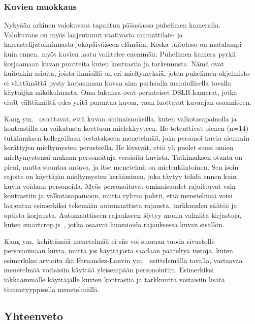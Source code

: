 \documentclass[finnish, 12pt, a4paper, elec, utf8, a-1b]{aaltothesis}
\begin{document}
\subsubsection{Kuvien muokkaus}\label{images-personalization}

Nykyään arkinen valokuvaus tapahtuu pääasiassa puhelimen kameralla. Valokuvaus
on myös laajentunut vaativasta ammattilais- ja harrastelijatoiminnasta
jokapäiväiseen elämään. Koska taitotaso on matalampi kuin ennen, myös kuvien
laatu vaihtelee enemmän. Puhelimen kamera pyrkii korjaamaan kuvan puutteita
kuten kontrastia ja tarkennusta. Nämä ovat kuitenkin asioita, joista ihmisillä
on eri mieltymyksiä, joten puhelimen ohjelmisto ei välttämättä pysty korjaamaan
kuvaa aina parhaalla mahdollisella tavalla käyttäjän näkökulmasta. Oma lukunsa
ovat perinteiset DSLR-kamerat, jotka eivät välttämättä edes yritä parantaa
kuvaa, vaan luottavat kuvaajan osaamiseen.

Kang ym.~\cite{5539850} osoittavat, että kuvan ominaisuuksilla, kuten
valkotasapainolla ja kontrastilla on vaikutusta koettuun mielekkyyteen. He
toteuttivat pienen (n=14) tutkimuksen kollegoillaan testatakseen menetelmää,
joka personoi kuvia aiemmin kerättyjen mieltymysten perusteella. He löysivät,
että yli puolet suosi omien mieltymystensä mukaan personoituja versioita
kuvista. Tutkimuksen otanta on pieni, mutta suuntaa antava, ja itse menetelmä on
mielenkiintoinen. Sen isoin rajoite on käyttäjän mieltymysten kerääminen, joka
täytyy tehdä ennen kuin kuvia voidaan personoida. Myös personoitavat
ominaisuudet rajoittuvat vain kontrastiin ja valkotasapainoon, mutta ryhmä
pohtii, että menetelmää voisi laajentaa esimerkiksi tekemään automaattista
rajausta, tarkkuuden säätöä ja optista korjausta. Automaattiseen rajaukseen
löytyy monia valmiita kirjastoja, kuten smartcrop.js~\cite{smartcrop}, jotka
osaavat huomioida rajauksessa kuvan sisällön.

Kang ym.~kehittämää menetelmää ei siis voi suoraan tuoda sivustolle
personoimaan kuvia, mutta jos käyttäjästä saadaan pääteltyä tietoja, kuten
esimerkiksi arvioitu ikä Fernandez-Lanvin ym.~\cite{fernandez2018dimension}
esittelemällä tavalla, vastaavaa menetelmää voitaisiin käyttää yleisempään
personointiin. Esimerkiksi iäkkäämmälle käyttäjälle kuvien kontrastia ja
tarkkuutta voitaisiin lisätä tämäntyyppisellä menetelmällä.

\subsection{Yhteenveto}
\end{document}
